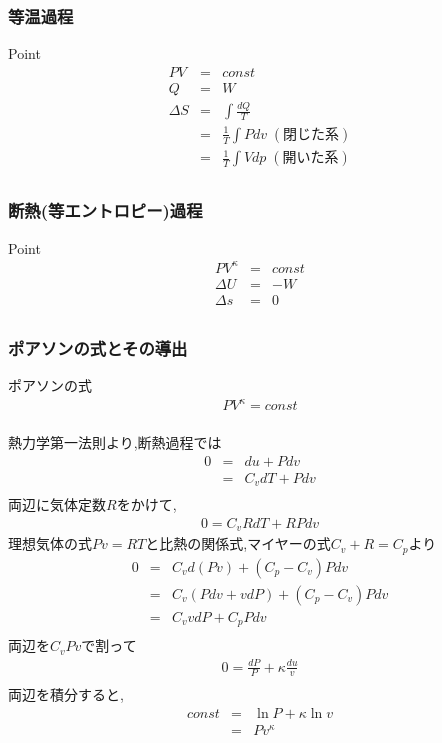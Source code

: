 \documentclass[a4paper]{jsarticle}
\begin{document}
\subsubsection{等温過程}
\begin{itembox}[l]{Point}
    \begin{eqnarray*}
        PV&=&const\\
        Q&=&W\\
        \Delta S
        &=& \int \frac{dQ}{T}\\
        &=& \frac{1}{T}\int Pdv\;(閉じた系)\\
        &=& \frac{1}{T}\int Vdp\;(開いた系)\\
    \end{eqnarray*}
\end{itembox}
\subsubsection{断熱(等エントロピー)過程}
\begin{itembox}[l]{Point}
    \begin{eqnarray*}
        PV^\kappa&=&const\\
        \Delta U&=&- W\\
        \Delta s&=&0\\
    \end{eqnarray*}
\end{itembox}
\subsubsection{ポアソンの式とその導出}
\begin{itembox}[l]{ポアソンの式}
    \begin{eqnarray*}
        PV^\kappa=const\\
    \end{eqnarray*}
\end{itembox}
熱力学第一法則より,断熱過程では
\begin{eqnarray*}
    0
    &=&du+Pdv\\
    &=&C_vdT+Pdv\\
\end{eqnarray*}
両辺に気体定数$R$をかけて,
\begin{eqnarray*}
    0=C_vRdT+RPdv
\end{eqnarray*}
理想気体の式$Pv=RT$と比熱の関係式,マイヤーの式$C_v+R=C_p$より
\begin{eqnarray*}
    0&=&C_vd\left(Pv\right)+\left(C_p-C_v\right)Pdv\\
    &=&C_v\left(Pdv+vdP\right)+\left(C_p-C_v\right)Pdv\\
    &=&C_vvdP+C_pPdv\\
\end{eqnarray*}
両辺を$C_vPv$で割って
\begin{eqnarray*}
    0=\frac{dP}{P}+\kappa\frac{du}{v}\\
\end{eqnarray*}
両辺を積分すると,
\begin{eqnarray*}
    const&=&\ln P+\kappa\ln v\\
    &=&Pv^\kappa\\
\end{eqnarray*}
\end{document}
